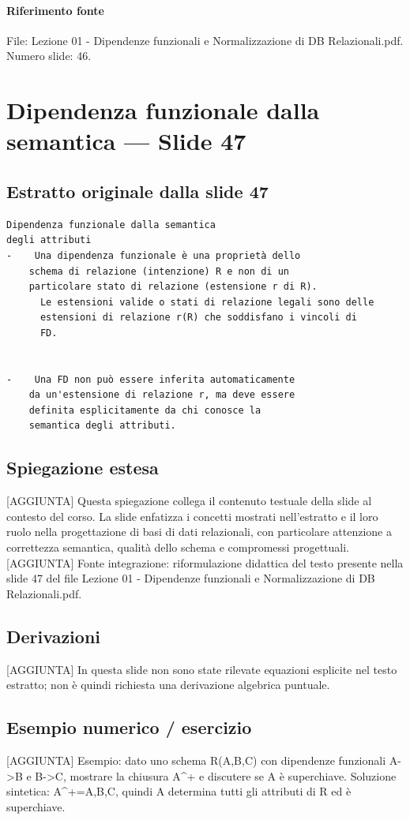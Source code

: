 \documentclass[11pt]{article}
\begin{document}
\paragraph{Riferimento fonte} File: Lezione 01 - Dipendenze funzionali e Normalizzazione di DB Relazionali.pdf. Numero slide: 46.
\section{Dipendenza funzionale dalla semantica --- Slide 47}
\subsection*{Estratto originale dalla slide 47}
\begin{lstlisting}
Dipendenza funzionale dalla semantica
degli attributi
-    Una dipendenza funzionale è una proprietà dello
    schema di relazione (intenzione) R e non di un
    particolare stato di relazione (estensione r di R).
      Le estensioni valide o stati di relazione legali sono delle
      estensioni di relazione r(R) che soddisfano i vincoli di
      FD.


-    Una FD non può essere inferita automaticamente
    da un'estensione di relazione r, ma deve essere
    definita esplicitamente da chi conosce la
    semantica degli attributi.
\end{lstlisting}
\subsection*{Spiegazione estesa}
[AGGIUNTA] Questa spiegazione collega il contenuto testuale della slide al contesto del corso. La slide enfatizza i concetti mostrati nell'estratto e il loro ruolo nella progettazione di basi di dati relazionali, con particolare attenzione a correttezza semantica, qualità dello schema e compromessi progettuali.
[AGGIUNTA] Fonte integrazione: riformulazione didattica del testo presente nella slide 47 del file Lezione 01 - Dipendenze funzionali e Normalizzazione di DB Relazionali.pdf.
\subsection*{Derivazioni}
[AGGIUNTA] In questa slide non sono state rilevate equazioni esplicite nel testo estratto; non è quindi richiesta una derivazione algebrica puntuale.
\subsection*{Esempio numerico / esercizio}
[AGGIUNTA] Esempio: dato uno schema R(A,B,C) con dipendenze funzionali A->B e B->C, mostrare la chiusura A^+ e discutere se A è superchiave. Soluzione sintetica: A^+={A,B,C}, quindi A determina tutti gli attributi di R ed è superchiave.
\end{document}
